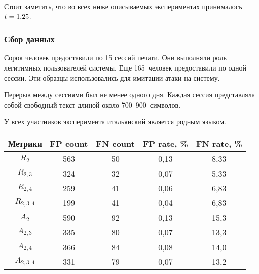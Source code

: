 \begin{multicols}{2}
Стоит заметить, что во всех ниже описываемых экспериментах принималось $t \hm= 1{,}25$.

\subsubsection{Сбор данных}

Сорок человек предоставили по 15 сессий печати. Они выполняли роль
легитимных пользователей системы. Еще 165~человек предоставили по
одной сессии. Эти образцы использовались для имитации атаки на
систему.

Перерыв между сессиями был не менее одного дня. Каждая сессия
представляла собой свободный текст длиной около 700--900~символов.

У всех участников эксперимента итальянский является родным языком.

\begin{table*}[b]\small %
\begin{center}
        \label{res_sing}
\vspace*{2ex}

    \begin{tabular}{|c|c|c|c|c|}
                    \hline
                    Метрики& FP count& FN count & FP rate, \% & FN rate, \%\\
                    \hline
 $R_2$ & 563& 50& 0,13& 8,33\\
 $R_{2,3}$ &  324& 32& 0,07& 5,33\\
 $R_{2,4}$ & 259& 41& 0,06& 6,83\\
 $R_{2,3,4}$ &  199& 41& 0,04& 6,83\\
 $A_2$ &  590& 92& 0,13& 15,3\\
 $A_{2,3}$ &  335& 80& 0,07& 13,3\\
 $A_{2,4}$ &  366& 84& 0,08 & 14,0 \\
 $A_{2,3,4}$ & 331& 79& 0,07& 13,2\\
        \hline
          \end{tabular}
    \end{center}
\begin{center}
    \label{res_sum}
    \vspace*{2ex}
    

\end{center}
\end{table*}
\end{multicols}
